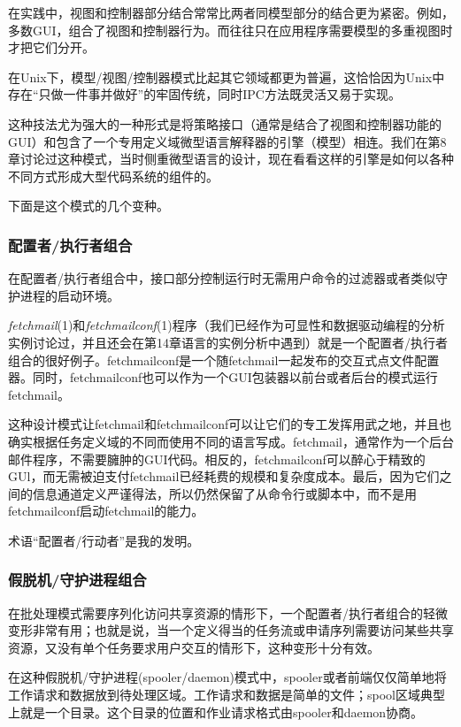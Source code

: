 \documentclass[12pt,oneside]{book}
\begin{document}
在实践中，视图和控制器部分结合常常比两者同模型部分的结合更为紧密。例如，多数GUI，组合了视图和控制器行为。而往往只在应用程序需要模型的多重视图时才把它们分开。

在Unix下，模型/视图/控制器模式比起其它领域都更为普遍，这恰恰因为Unix中存在“只做一件事并做好”的牢固传统，同时IPC方法既灵活又易于实现。

这种技法尤为强大的一种形式是将策略接口（通常是结合了视图和控制器功能的GUI）和包含了一个专用定义域微型语言解释器的引擎（模型）相连。我们在第8章讨论过这种模式，当时侧重微型语言的设计，现在看看这样的引擎是如何以各种不同方式形成大型代码系统的组件的。

下面是这个模式的几个变种。

\subsubsection{配置者/执行者组合}
在配置者/执行者组合中，接口部分控制运行时无需用户命令的过滤器或者类似守护进程的启动环境。

\textit{fetchmail}(1)和\textit{fetchmailconf}(1)程序（我们已经作为可显性和数据驱动编程的分析实例讨论过，并且还会在第14章语言的实例分析中遇到）就是一个配置者/执行者组合的很好例子。fetchmailconf是一个随fetchmail一起发布的交互式点文件配置器。同时，fetchmailconf也可以作为一个GUI包装器以前台或者后台的模式运行fetchmail。

这种设计模式让fetchmail和fetchmailconf可以让它们的专工发挥用武之地，并且也确实根据任务定义域的不同而使用不同的语言写成。fetchmail，通常作为一个后台邮件程序，不需要臃肿的GUI代码。相反的，fetchmailconf可以醉心于精致的GUl，而无需被迫支付fetchmail已经耗费的规模和复杂度成本。最后，因为它们之间的信息通道定义严谨得法，所以仍然保留了从命令行或脚本中，而不是用fetchmailconf启动fetchmail的能力。

术语“配置者/行动者”是我的发明。

\subsubsection{假脱机/守护进程组合}
在批处理模式需要序列化访问共享资源的情形下，一个配置者/执行者组合的轻微变形非常有用；也就是说，当一个定义得当的任务流或申请序列需要访问某些共享资源，又没有单个任务要求用户交互的情形下，这种变形十分有效。

在这种假脱机/守护进程(spooler/daemon)模式中，spooler或者前端仅仅简单地将工作请求和数据放到待处理区域。工作请求和数据是简单的文件；spool区域典型上就是一个目录。这个目录的位置和作业请求格式由spooler和daemon协商。
\end{document}
